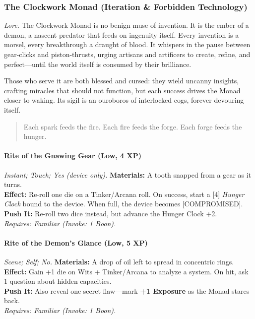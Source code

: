 
\subsubsection{The Clockwork Monad (Iteration \& Forbidden Technology)}
\textit{Lore.} The Clockwork Monad is no benign muse of invention. It is the ember of a demon, a nascent predator that feeds on ingenuity itself. Every invention is a morsel, every breakthrough a draught of blood. It whispers in the pause between gear-clicks and piston-thrusts, urging artisans and artificers to create, refine, and perfect—until the world itself is consumed by their brilliance.  

Those who serve it are both blessed and cursed: they wield uncanny insights, crafting miracles that should not function, but each success drives the Monad closer to waking. Its sigil is an ouroboros of interlocked cogs, forever devouring itself.

\begin{quote}
Each spark feeds the fire. Each fire feeds the forge. Each forge feeds the hunger.  
\end{quote}


\paragraph*{Rite of the Gnawing Gear (Low, 4 XP)} \emph{Instant; Touch; Yes (device only).}  
\textbf{Materials:} A tooth snapped from a gear as it turns.\\
\textbf{Effect:} Re-roll one die on a Tinker/Arcana roll. On success, start a [4] \emph{Hunger Clock} bound to the device. When full, the device becomes [COMPROMISED].\\
\textbf{Push It:} Re-roll two dice instead, but advance the Hunger Clock +2.\\
\emph{Requires: Familiar (\textit{Invoke:} 1 Boon).}

\paragraph*{Rite of the Demon’s Glance (Low, 5 XP)} \emph{Scene; Self; No.}  
\textbf{Materials:} A drop of oil left to spread in concentric rings.\\
\textbf{Effect:} Gain +1 die on Wits + Tinker/Arcana to analyze a system. On hit, ask 1 question about hidden capacities.\\
\textbf{Push It:} Also reveal one secret flaw—mark \textbf{+1 Exposure} as the Monad stares back.\\
\emph{Requires: Familiar (\textit{Invoke:} 1 Boon).}


